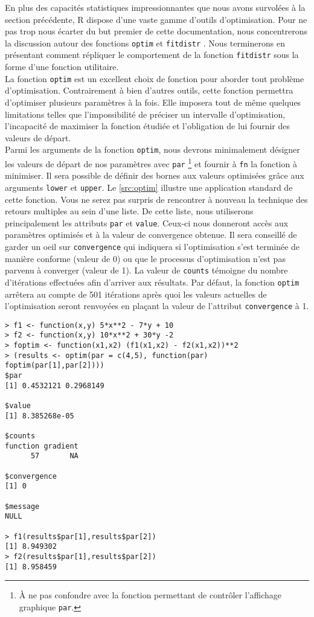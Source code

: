 En plus des capacités statistiques impressionnantes que nous avons survolées à la section précédente, R dispose d'une vaste gamme d'outils d'optimisation. Pour ne pas trop nous écarter du but premier de cette documentation, nous concentrerons la discussion autour des fonctions \texttt{optim} \cite{Rfunction:optim} et \texttt{fitdistr} \cite{Rfunction:fitdistr}. Nous terminerons en présentant comment répliquer le comportement de la fonction \texttt{fitdistr} sous la forme d'une fonction utilitaire. \\

La fonction \texttt{optim} est un excellent choix de fonction pour aborder tout problème d'optimisation. Contrairement à bien d'autres outils, cette fonction permettra d'optimiser plusieurs paramètres à la fois. Elle imposera tout de même quelques limitations telles que l'impossibilité de préciser un intervalle d'optimisation, l'incapacité de maximiser la fonction étudiée et l'obligation de lui fournir des valeurs de départ. \cite{optim} \\

Parmi les arguments de la fonction \texttt{optim}, nous devrons minimalement désigner les valeurs de départ de nos paramètres avec \texttt{par} \footnote{À ne pas confondre avec la fonction permettant de contrôler l'affichage graphique \texttt{par}.} et fournir à \texttt{fn} la fonction à minimiser. Il sera possible de définir des bornes aux valeurs optimisées grâce aux arguments \texttt{lower} et \texttt{upper}. Le \autoref{src:optim} illustre une application standard de cette fonction. Vous ne serez pas surpris de rencontrer à nouveau la technique des retours multiples au sein d'une liste. De cette liste, nous utiliserons principalement les attributs \texttt{par} et \texttt{value}. Ceux-ci nous donneront accès aux paramètres optimisés et à la valeur de convergence obtenue. Il sera conseillé de garder un oeil sur \texttt{convergence} qui indiquera si l'optimisation s'est terminée de manière conforme (valeur de 0) ou que le processus d'optimisation  n’est pas parvenu à converger (valeur de 1). La valeur de \texttt{counts} témoigne du nombre d'itérations effectuées afin d'arriver aux résultats. Par défaut, la fonction \texttt{optim} arrêtera au compte de 501 itérations après quoi les valeurs actuelles de l'optimisation seront renvoyées en plaçant la valeur de l'attribut \texttt{convergence} à 1. \\

\begin{lstlisting}[caption = Optimisation générique avec R,label=src:optim]
> f1 <- function(x,y) 5*x**2 - 7*y + 10
> f2 <- function(x,y) 10*x**2 + 30*y -2
> foptim <- function(x1,x2) (f1(x1,x2) - f2(x1,x2))**2
> (results <- optim(par = c(4,5), function(par) foptim(par[1],par[2])))
$par
[1] 0.4532121 0.2968149

$value
[1] 8.385268e-05

$counts
function gradient
      57       NA

$convergence
[1] 0

$message
NULL

> f1(results$par[1],results$par[2])
[1] 8.949302
> f2(results$par[1],results$par[2])
[1] 8.958459
\end{lstlisting}


